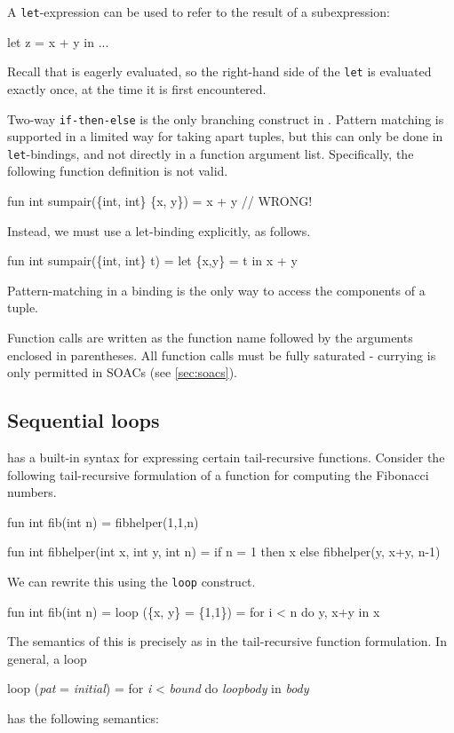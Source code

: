 A \texttt{let}-expression can be used to refer to the result of a
subexpression:
\begin{colorcode}
  let z = x + y in ...
\end{colorcode}
Recall that \LO{} is eagerly evaluated, so the right-hand side of the
\texttt{let} is evaluated exactly once, at the time it is first
encountered.

Two-way \texttt{if-then-else} is the only branching construct in \LO{}.
Pattern matching is supported in a limited way for taking apart
tuples, but this can only be done in \texttt{let}-bindings, and not
directly in a function argument list.  Specifically, the following
function definition is not valid.
\begin{colorcode}
  fun int sumpair(\{int, int\} \{x, y\}) = x + y // WRONG!
\end{colorcode}
Instead, we must use a let-binding explicitly, as follows.
\begin{colorcode}
  fun int sumpair(\{int, int\} t) =
    let \{x,y\} = t in x + y
\end{colorcode}
Pattern-matching in a binding is the only way to access the components
of a tuple.

Function calls are written as the function name followed by the
arguments enclosed in parentheses.  All function calls must be fully
saturated - currying is only permitted in SOACs (see
\cref{sec:soacs}).

\subsection{Sequential loops}

\LO{} has a built-in syntax for expressing certain tail-recursive
functions.  Consider the following tail-recursive formulation of a
function for computing the Fibonacci numbers.
\begin{colorcode}
  fun int fib(int n) = fibhelper(1,1,n)

  fun int fibhelper(int x, int y, int n) =
    if n = 1 then x else fibhelper(y, x+y, n-1)
\end{colorcode}
We can rewrite this using the \texttt{loop} construct.
\begin{colorcode}
  fun int fib(int n) =
    loop (\{x, y\} = \{1,1\}) = for i < n do
                              {y, x+y}
    in x
\end{colorcode}
The semantics of this is precisely as in the tail-recursive function
formulation.  In general, a loop
\begin{colorcode}
  loop (\emph{pat} = \emph{initial}) = for \emph{i} < \emph{bound} do \emph{loopbody}
  in \emph{body}
\end{colorcode}
has the following semantics:

